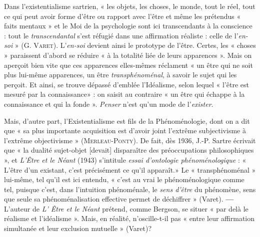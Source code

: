 Dans l’existentialisme sartrien, « les objets, les choses, le monde, tout le
réel, tout ce qui peut avoir forme d’être ou rapport avec l'être et même les
prétendus « faits mentaux » et le Moi de la psychologie sont ici transcendants
à la conscience : tout le {\it transcendantal} s’est réfugié dans une affirmation
réaliste : celle de l'{\it en-soi} » (G. \textsc{Varet}). L'{\it en-soi} devient ainsi le
prototype de l'être. Certes, les « choses » paraissent d’abord se réduire « à la
totalité liée de leurs apparences ». Mais on aperçoit bien vite que ces apparences
elles-mêmes réclament « un être qui ne soit plus lui-même apparences,
un être {\it transphénoménal}, à savoir le sujet qui les perçoit. Et ainsi, se trouve
dépassé d'emblée l’Idéalisme, selon lequel « l'être est mesuré par la connaissance» :
on saisit au contraire « un être qui échappe à la connaissance et qui
la fonde ». {\it Penser} n’est qu’un mode de l'{\it exister}.

Mais, d’autre part, l’Existentialisme est fils de la Phénoménologie,
dont on a dit que « sa plus importante acquisition est d’avoir joint
l'extrême subjectivisme à l'extrême objectivisme » (\textsc{Merleau-Ponty}).
De fait, dès 1936, J.-P. Sartre écrivait que « la dualité sujet-objet
[devait] disparaître des préoccupations philosophiques », et {\it L'Être
et le Néant} (1943) s’intitule {\it essai d’ontologie phénoménologique} :
« L'être d’un existant, c’est précisément ce qu’il apparaît.» Le
« transphénoménal » lui-même, tel qu’il est ici entendu, « c’est au
vrai le phénoménologique comme tel, puisque c’est, dans l'intuition
phénoménale, le {\it sens d’être} du phénomène, sens que seule sa phénoménalisation
 effective permet de déchiffrer » (Varet). {\bf —} L'auteur de
{\it L’ Être et le Néant} prétend, comme Bergson, se situer « par delà le réalisme et
l’idéalisme ». Mais, en réalité, n’oscille-t-il pas « entre leur
affirmation simultanée et leur exclusion mutuelle » (Varet)?

